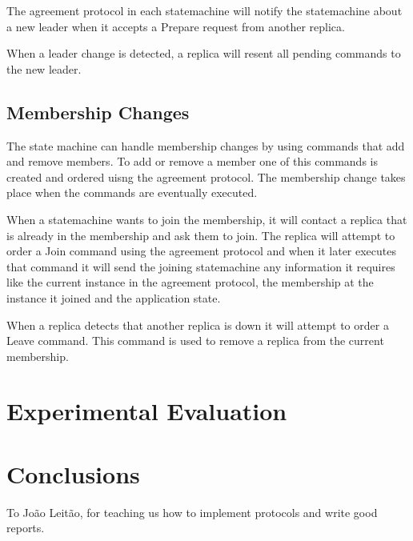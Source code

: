 \documentclass[sigconf]{acmart}
\begin{document}
The agreement protocol in each statemachine will notify the statemachine about a new leader
when it accepts a Prepare request from another replica.

When a leader change is detected, a replica will resent all pending commands to the new leader.


\subsection{Membership Changes}


The state machine can handle membership changes by using commands that add and remove members.
To add or remove a member one of this commands is created and ordered uisng the agreement protocol.
The membership change takes place when the commands are eventually executed.

When a statemachine wants to join the membership, it will contact a replica that is already in the membership and ask them to join.
The replica will attempt to order a Join command using the agreement protocol and when it later executes that command it will send
the joining statemachine any information it requires like the current instance in the agreement protocol, the membership at the instance
it joined and the application state.

When a replica detects that another replica is down it will attempt to order a Leave command.
This command is used to remove a replica from the current membership.


\section{Experimental Evaluation}

\section{Conclusions}

\begin{acks}
    To João Leitão, for teaching us how to implement protocols and write good reports.
\end{acks}



\end{document}
